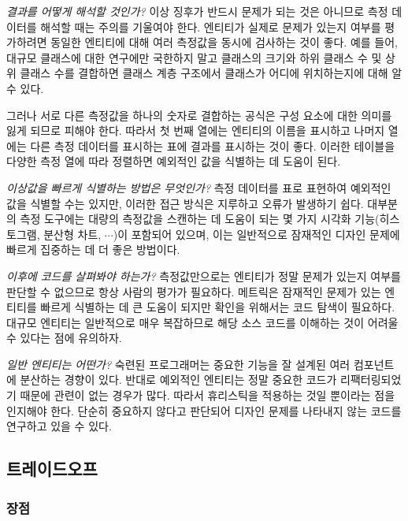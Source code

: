 \documentclass[a4paper,10pt,twoside]{book}
\begin{document}
\begin{bulletlist}

\item \emph{결과를 어떻게 해석할 것인가?}
이상 징후가 반드시 문제가 되는 것은 아니므로 측정 데이터를 해석할 때는 주의를 기울여야 한다. 엔티티가 실제로 문제가 있는지 여부를 평가하려면 동일한 엔티티에 대해 여러 측정값을 동시에 검사하는 것이 좋다. 예를 들어, 대규모 클래스에 대한 연구에만 국한하지 말고 클래스의 크기와 하위 클래스 수 및 상위 클래스 수를 결합하면 클래스 계층 구조에서 클래스가 어디에 위치하는지에 대해 알 수 있다.

그러나 서로 다른 측정값을 하나의 숫자로 결합하는 공식은 구성 요소에 대한 의미를 잃게 되므로 피해야 한다. 따라서 첫 번째 열에는 엔티티의 이름을 표시하고 나머지 열에는 다른 측정 데이터를 표시하는 표에 결과를 표시하는 것이 좋다. 이러한 테이블을 다양한 측정 열에 따라 정렬하면 예외적인 값을 식별하는 데 도움이 된다.

\item \emph{이상값을 빠르게 식별하는 방법은 무엇인가?}
측정 데이터를 표로 표현하여 예외적인 값을 식별할 수는 있지만, 이러한 접근 방식은 지루하고 오류가 발생하기 쉽다. 대부분의 측정 도구에는 대량의 측정값을 스캔하는 데 도움이 되는 몇 가지 시각화 기능(히스토그램, 분산형 차트, $\cdots$)이 포함되어 있으며, 이는 일반적으로 잠재적인 디자인 문제에 빠르게 집중하는 데 더 좋은 방법이다.

\item \emph{이후에 코드를 살펴봐야 하는가?}
측정값만으로는 엔티티가 정말 문제가 있는지 여부를 판단할 수 없으므로 항상 사람의 평가가 필요하다. 메트릭은 잠재적인 문제가 있는 엔티티를 빠르게 식별하는 데 큰 도움이 되지만 확인을 위해서는 코드 탐색이 필요하다. 대규모 엔티티는 일반적으로 매우 복잡하므로 해당 소스 코드를 이해하는 것이 어려울 수 있다는 점에 유의하자.

\item \emph{일반 엔티티는 어떤가?}
숙련된 프로그래머는 중요한 기능을 잘 설계된 여러 컴포넌트에 분산하는 경향이 있다. 반대로 예외적인 엔티티는 정말 중요한 코드가 리팩터링되었기 때문에 관련이 없는 경우가 많다. 따라서 휴리스틱을 적용하는 것일 뿐이라는 점을 인지해야 한다. 단순히 중요하지 않다고 판단되어 디자인 문제를 나타내지 않는 코드를 연구하고 있을 수 있다.
\end{bulletlist}

\subsection*{트레이드오프}

\subsubsection*{장점}
\end{document}
